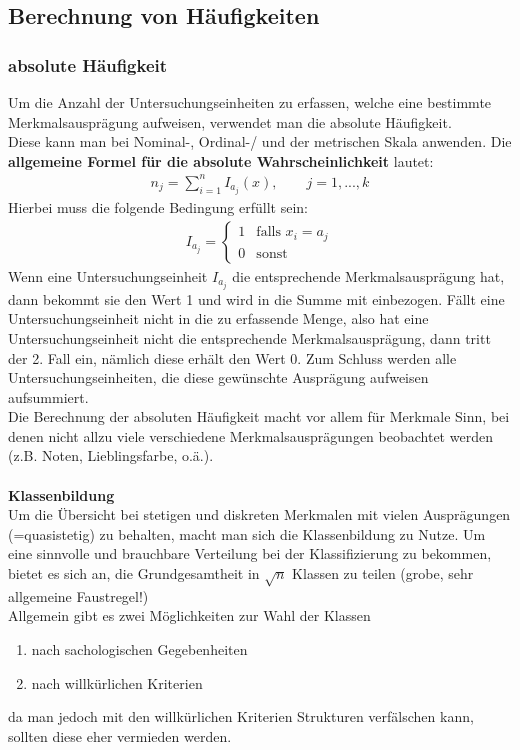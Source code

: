 \documentclass[a4paper]{article}
\begin{document}
\subsection{Berechnung von Häufigkeiten}
\subsubsection{absolute Häufigkeit}\label{sec:abs.Häuf}
Um die Anzahl der Untersuchungseinheiten zu erfassen, welche eine bestimmte Merkmalsausprägung aufweisen, verwendet man die absolute Häufigkeit.\\
Diese kann man bei Nominal-, Ordinal-/ und der metrischen Skala anwenden.
Die \textbf{allgemeine Formel für die absolute Wahrscheinlichkeit} lautet:
\begin{align*}
    n_j=\sum_{i=1}^n I_{a_j} (x),\qquad  j=1,...,k
\end{align*}
Hierbei muss die folgende Bedingung erfüllt sein:
\begin{align*}
    I_{a_j}=\begin{cases}
			1 & \text{falls } x_i = a_j \\
            0 & \text{sonst}
		 \end{cases}
\end{align*}
Wenn eine Untersuchungseinheit $I_{a_j}$ die entsprechende Merkmalsausprägung hat, dann bekommt sie den Wert 1 und wird in die Summe mit einbezogen. Fällt eine Untersuchungseinheit nicht in die zu erfassende Menge, also hat eine Untersuchungseinheit nicht die entsprechende Merkmalsausprägung, dann tritt der 2. Fall ein, nämlich diese erhält den Wert 0. Zum Schluss werden alle Untersuchungseinheiten, die diese gewünschte Ausprägung aufweisen aufsummiert.\\
Die Berechnung der absoluten Häufigkeit macht vor allem für Merkmale Sinn, bei denen nicht allzu viele verschiedene Merkmalsausprägungen beobachtet werden (z.B. Noten, Lieblingsfarbe, o.ä.).
\\
\\
\textbf{Klassenbildung} \label{sec:Klassenbildung}\\
Um die Übersicht bei stetigen und diskreten Merkmalen mit vielen Ausprägungen (=quasistetig) zu behalten, macht man sich die Klassenbildung zu Nutze.
Um eine sinnvolle und brauchbare Verteilung bei der Klassifizierung zu bekommen, bietet es sich an, die Grundgesamtheit in $\sqrt{n}$ Klassen zu teilen (grobe, sehr allgemeine Faustregel!)\\
Allgemein gibt es zwei Möglichkeiten zur Wahl der Klassen
\begin{enumerate}
    \item nach sachologischen Gegebenheiten
    \item nach willkürlichen Kriterien
\end{enumerate}
da man jedoch mit den willkürlichen Kriterien Strukturen verfälschen kann, sollten diese eher vermieden werden.
\end{document}
